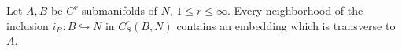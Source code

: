 Let $A, B$ be $C^r$ submanifolds of $N$, $1 \leqslant r \leqslant \infty$. Every neighborhood of the inclusion $i_B: B \hookrightarrow N$ in $C^r_S(B,N)$ contains an embedding which is transverse to $A$.
